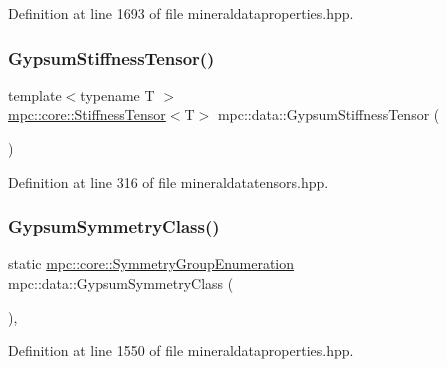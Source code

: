Definition at line 1693 of file mineraldataproperties.\+hpp.

\mbox{\label{namespacempc_1_1data_a5d935d5bdfff2b3b23a6089c3bf0a5f7}} 
\subsubsection{\texorpdfstring{Gypsum\+Stiffness\+Tensor()}{GypsumStiffnessTensor()}}
{\footnotesize\ttfamily template$<$typename T $>$ \\
\mbox{\hyperlink{structmpc_1_1core_1_1_stiffness_tensor}{mpc\+::core\+::\+Stiffness\+Tensor}}$<$T$>$ mpc\+::data\+::\+Gypsum\+Stiffness\+Tensor (\begin{DoxyParamCaption}{ }\end{DoxyParamCaption})}



Definition at line 316 of file mineraldatatensors.\+hpp.

\mbox{\label{namespacempc_1_1data_ad80d950559624802898e23e000ce43c1}} 
\subsubsection{\texorpdfstring{Gypsum\+Symmetry\+Class()}{GypsumSymmetryClass()}}
{\footnotesize\ttfamily static \mbox{\hyperlink{namespacempc_1_1core_a9d979684062547055a0ef5c13077bad8}{mpc\+::core\+::\+Symmetry\+Group\+Enumeration}} mpc\+::data\+::\+Gypsum\+Symmetry\+Class (\begin{DoxyParamCaption}{ }\end{DoxyParamCaption})\hspace{0.3cm}{\ttfamily [inline]}, {\ttfamily [static]}}



Definition at line 1550 of file mineraldataproperties.\+hpp.

\mbox{\label{namespacempc_1_1data_a9fec94c3481a923b9e61294d9b035ea7}} 
